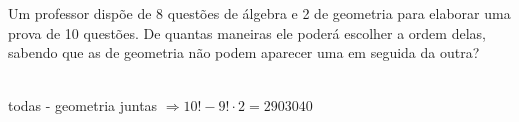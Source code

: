 \begin{ex}
 Um professor dispõe de 8 questões de álgebra e 2 de geometria para elaborar uma prova de 10 questões. De quantas maneiras ele poderá escolher a ordem delas, sabendo que as de geometria não podem aparecer uma em seguida da outra?
 \begin{sol}
     \phantom{A} \\
 todas - geometria juntas $\Longrightarrow 10! - 9!\cdot 2= 2903040$
 
 \end{sol}
\end{ex}